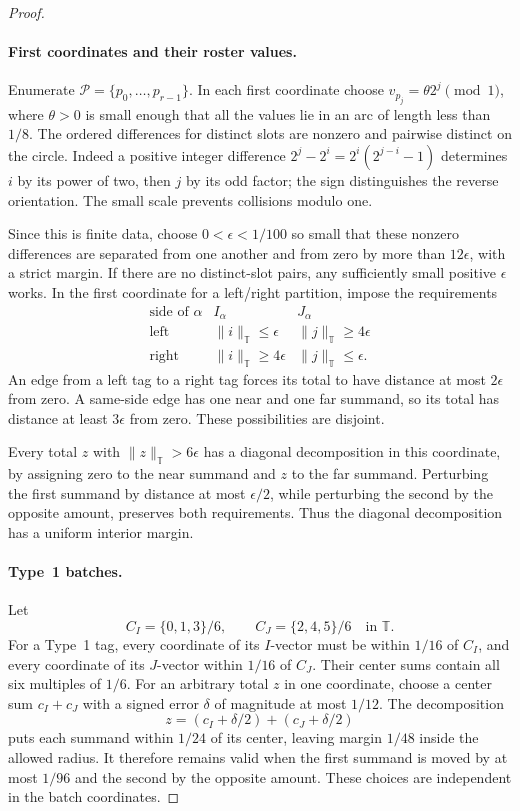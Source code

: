 \begin{proof}
\paragraph{First coordinates and their roster values.}
Enumerate $\mathcal P=\{p_0,\ldots,p_{r-1}\}$. In each first
coordinate choose $v_{p_j}=\theta2^j\pmod1$, where $\theta>0$ is
small enough that all the values lie in an arc of length less than
$1/8$. The ordered differences for distinct slots are nonzero and
pairwise distinct on the circle. Indeed a positive integer difference
$2^j-2^i=2^i(2^{j-i}-1)$ determines $i$ by its power of two, then
$j$ by its odd factor; the sign distinguishes the reverse orientation.
The small scale prevents collisions modulo one.

Since this is finite data, choose $0<\epsilon<1/100$ so small that
these nonzero differences are separated from one another and from
zero by more than $12\epsilon$, with a strict margin. If there are
no distinct-slot pairs, any sufficiently small positive $\epsilon$
works. In the first coordinate for a left/right partition, impose
the requirements
\[
\begin{array}{c|cc}
 \text{side of }\alpha & I_\alpha & J_\alpha\\ \hline
 \text{left}  & \|i\|_{\mathbb T}\le\epsilon
               & \|j\|_{\mathbb T}\ge4\epsilon\\
 \text{right} & \|i\|_{\mathbb T}\ge4\epsilon
               & \|j\|_{\mathbb T}\le\epsilon.
\end{array}
\]
An edge from a left tag to a right tag forces its total to have
distance at most $2\epsilon$ from zero. A same-side edge has one
near and one far summand, so its total has distance at least
$3\epsilon$ from zero. These possibilities are disjoint.

Every total $z$ with $\|z\|_{\mathbb T}>6\epsilon$ has a diagonal
decomposition in this coordinate, by assigning zero to the near
summand and $z$ to the far summand. Perturbing the first summand by
distance at most $\epsilon/2$, while perturbing the second by the
opposite amount, preserves both requirements. Thus the diagonal
decomposition has a uniform interior margin.

\paragraph{Type~1 batches.}
Let
\[
       C_I=\{0,1,3\}/6,\qquad C_J=\{2,4,5\}/6
                 \quad\text{in }\mathbb T.
\]
For a Type~1 tag, every coordinate of its $I$-vector must be within
$1/16$ of $C_I$, and every coordinate of its $J$-vector within $1/16$
of $C_J$. Their center sums contain all six multiples of $1/6$.
For an arbitrary total $z$ in one coordinate, choose a center sum
$c_I+c_J$ with a signed error $\delta$ of magnitude at most $1/12$.
The decomposition
\[
                   z=(c_I+\delta/2)+(c_J+\delta/2)
\]
puts each summand within $1/24$ of its center, leaving margin $1/48$
inside the allowed radius. It therefore remains valid when the first
summand is moved by at most $1/96$ and the second by the opposite
amount. These choices are independent in the batch coordinates.


\end{proof}
